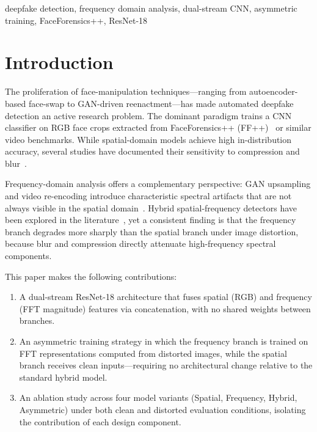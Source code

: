 \documentclass[conference]{IEEEtran}
\begin{document}
\begin{IEEEkeywords}
deepfake detection, frequency domain analysis, dual-stream CNN,
asymmetric training, FaceForensics++, ResNet-18
\end{IEEEkeywords}

\section{Introduction}

The proliferation of face-manipulation techniques---ranging from
autoencoder-based face-swap to GAN-driven reenactment---has made
automated deepfake detection an active research problem. The dominant
paradigm trains a CNN classifier on RGB face crops extracted from
FaceForensics++ (FF++)~\cite{rossler2019faceforensics} or similar
video benchmarks. While spatial-domain models achieve high
in-distribution accuracy, several studies have documented their
sensitivity to compression and blur~\cite{zhao2021multiattentional,
yan2023deepfakebench}.

Frequency-domain analysis offers a complementary perspective: GAN
upsampling and video re-encoding introduce characteristic spectral
artifacts that are not always visible in the spatial
domain~\cite{frank2020leveraging}. Hybrid spatial-frequency detectors
have been explored in the literature~\cite{qian2020thinking}, yet a
consistent finding is that the frequency branch degrades more sharply
than the spatial branch under image distortion, because blur and
compression directly attenuate high-frequency spectral components.

This paper makes the following contributions:
\begin{enumerate}
  \item A dual-stream ResNet-18 architecture that fuses spatial (RGB)
        and frequency (FFT magnitude) features via concatenation,
        with no shared weights between branches.
  \item An asymmetric training strategy in which the frequency branch
        is trained on FFT representations computed from distorted
        images, while the spatial branch receives clean
        inputs---requiring no architectural change relative to the
        standard hybrid model.
  \item An ablation study across four model variants (Spatial,
        Frequency, Hybrid, Asymmetric) under both clean and distorted
        evaluation conditions, isolating the contribution of each
        design component.
\end{enumerate}
\end{document}
